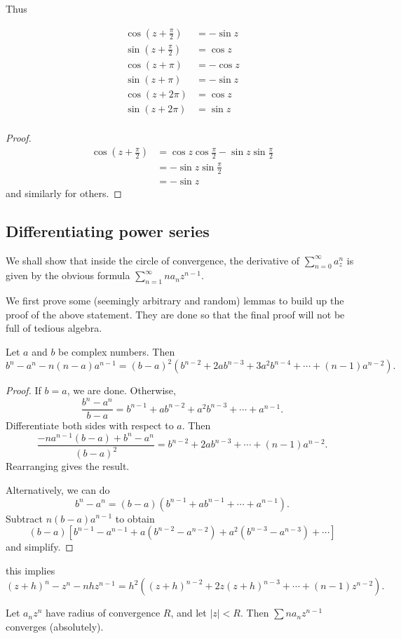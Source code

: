 \documentclass[a4paper]{article}
\begin{document}
Thus
\begin{prop}
  \begin{align*}
    \cos \left(z + \frac{\pi}{2}\right) &= -\sin z\\
    \sin \left(z + \frac{\pi}{2}\right) &= \cos z\\
    \cos (z + \pi) &= -\cos z\\
    \sin (z + \pi) &= -\sin z\\
    \cos (z + 2\pi) &= \cos z\\
    \sin (z + 2\pi) &= \sin z\\
  \end{align*}
\end{prop}

\begin{proof}
  \begin{align*}
    \cos\left(z + \frac{\pi}{2}\right) &= \cos z\cos \frac{\pi}{2} - \sin z\sin \frac{\pi}{2}\\
    &= -\sin z\sin \frac{\pi}{2}\\
    &= -\sin z
  \end{align*}
  and similarly for others.
\end{proof}
\subsection{Differentiating power series}
We shall show that inside the circle of convergence, the derivative of $\sum_{n = 0}^\infty a_z^n$ is given by the obvious formula $\sum_{n = 1}^\infty na_n z^{n - 1}$.

We first prove some (seemingly arbitrary and random) lemmas to build up the proof of the above statement. They are done so that the final proof will not be full of tedious algebra.

\begin{lemma}
  Let $a$ and $b$ be complex numbers. Then
  \[
    b^n - a^n - n(n - a)a^{n - 1} = (b - a)^2(b^{n - 2} + 2ab^{n - 3} + 3a^2 b^{n - 4} + \cdots + (n - 1)a^{n - 2}).
  \]
\end{lemma}

\begin{proof}
  If $b = a$, we are done. Otherwise,
  \[
    \frac{b^n - a^n}{b - a} = b^{n - 1} + ab^{n - 2} + a^2b^{n - 3} + \cdots + a^{n - 1}.
  \]
  Differentiate both sides with respect to $a$. Then
  \[
    \frac{-na^{n - 1}(b - a) + b^n - a^n}{(b - a)^2} = b^{n - 2} + 2ab^{n - 3} + \cdots + (n - 1)a^{n - 2}.
  \]
  Rearranging gives the result.

  Alternatively, we can do
  \[
    b^n - a^n = (b - a)(b^{n -1 } + ab^{n - 1} + \cdots + a^{n - 1}).
  \]
  Subtract $n(b - a)a^{n - 1}$ to obtain
  \[
    (b - a)[b^{n - 1} - a^{n - 1} + a(b^{n - 2} - a^{n - 2}) + a^2(b^{n - 3} - a^{n -3 }) + \cdots]
  \]
  and simplify.
\end{proof}
\note this implies
\[
  (z + h)^n - z^n - nhz^{n - 1} = h^2((z + h)^{n - 2} + 2z(z + h)^{n - 3} + \cdots + (n - 1)z^{n - 2}).
\]
\begin{lemma}
  Let $a_n z^n$ have radius of convergence $R$, and let $|z| < R$. Then $\sum na_n z^{n - 1}$ converges (absolutely).
\end{lemma}
\end{document}
